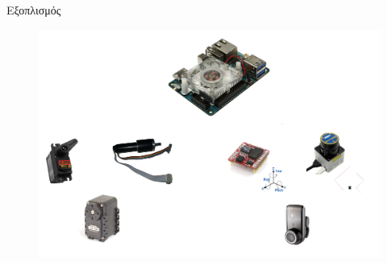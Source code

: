 \documentclass[10pt, compress, handout]{beamer} %
\begin{document}
%
%


\begin{frame}{Εξοπλισμός}
	\begin{figure}
		\includegraphics[width=\linewidth]{Figures/electronics.png}
	\end{figure}
\end{frame}
\end{document}

